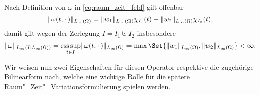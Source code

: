 \documentclass[../main.tex]{subfiles}
\begin{document}
\begin{Bemerkung}
\label{bemerkung:raum_zeit_feld_norm_zeitunabhaengig}
    Nach Definition von $\omega$ in \cref{eq:raum_zeit_feld} gilt offenbar
    \begin{equation}
        \lVert\omega(t, {\mkern2mu\cdot\mkern2mu})\rVert_{L_{\infty}(\Omega)} = \lVert w_{1}\rVert_{L_{\infty}(\Omega)} \chi_{I_{1}}(t) + \lVert w_{2}\rVert_{L_{\infty}(\Omega)} \chi_{I_{2}}(t),
    \end{equation}
    damit gilt wegen der Zerlegung $I = I_{1} \cupdot I_{2}$ insbesondere
    \begin{equation}
        \norm{\omega}_{L_{\infty}(I; L_{\infty}(\Omega))} = \esssup_{t \in I} \norm{\omega(t, \blank)}_{L_{\infty}(\Omega)} = \max\Set{ \norm{w_{1}}_{L_{\infty}(\Omega)}, \norm{w_{2}}_{L_{\infty}(\Omega)} } < \infty.
    \end{equation}
\end{Bemerkung}

Wir weisen nun zwei Eigenschaften für diesen Operator respektive die zugehörige Bilinearform nach, welche eine wichtige Rolle für die spätere Raum"=Zeit"=Variationsformulierung spielen werden.
\end{document}
